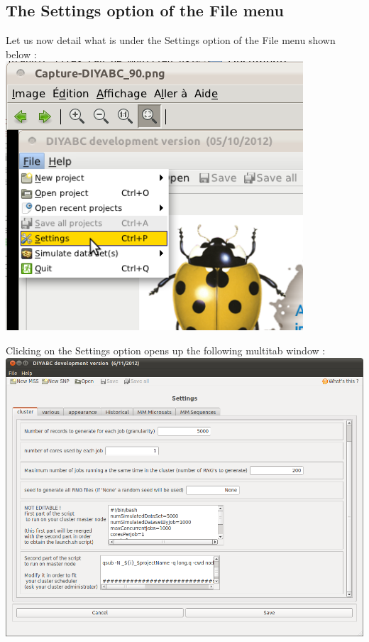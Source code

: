 \subsection{The \textsf{Settings} option of the \textsf{File} menu}

Let us now detail what is under the \textsf{Settings} option of the \textsf{File} menu shown below :\\

\includegraphics[scale=0.33]{gui_pictures/Capture-DIYABC-91.png} \\

\newpage

Clicking on the \textsf{Settings} option opens up the following multitab window :\\


\includegraphics[scale=0.33]{gui_pictures/Capture-DIYABC-cluster.png} \\
